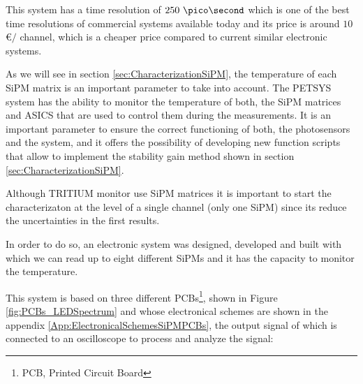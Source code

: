 This system has a time resolution of $250~\pico\second$ which is one of the best time resolutions of commercial systems available today and its price is around $10$\euro$/$ channel, which is a cheaper price compared to current similar electronic systems.

As we will see in section \ref{sec:CharacterizationSiPM}, the temperature of each SiPM matrix is an important parameter to take into account. The PETSYS system has the ability to monitor the temperature of both, the SiPM matrices and ASICS that are used to control them during the measurements. It is an important parameter to ensure the correct functioning of both, the photosensors and the system, and it offers the possibility of developing new function scripts that allow to implement the stability gain method shown in section \ref{sec:CharacterizationSiPM}.

Although TRITIUM monitor use SiPM matrices it is important to start the characterizaton at the level of a single channel (only one SiPM) since its reduce the uncertainties in the first results.


In order to do so, an electronic system was designed, developed and built with which we can read up to eight different SiPMs and it has the capacity to monitor the temperature.

This system is based on three different PCBs\footnote{PCB, Printed Circuit Board}, shown in Figure \ref{fig:PCBs_LEDSpectrum} and whose electronical schemes are shown in the appendix \ref{App:ElectronicalSchemesSiPMPCBs}, the output signal of which is connected to an oscilloscope to process and analyze the signal:

